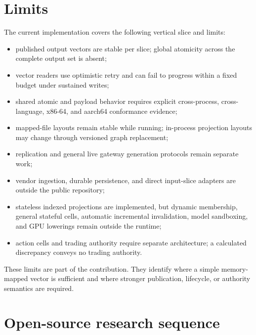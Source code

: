 \documentclass{strategynet-journal}
\begin{document}
\begin{SNcolumns}

\section{Limits}

The current implementation covers the following vertical slice and limits:
\begin{itemize}
  \item published output vectors are stable per slice; global atomicity across
        the complete output set is absent;
  \item vector readers use optimistic retry and can fail to progress within a
        fixed budget under sustained writes;
  \item shared atomic and payload behavior requires explicit cross-process,
        cross-language, x86-64, and aarch64 conformance evidence;
  \item mapped-file layouts remain stable while running; in-process projection
        layouts may change through versioned graph replacement;
  \item replication and general live gateway generation protocols remain
        separate work;
  \item vendor ingestion, durable persistence, and direct input-slice adapters
        are outside the public repository;
  \item stateless indexed projections are implemented, but dynamic membership,
        general stateful cells, automatic incremental invalidation, model
        sandboxing, and GPU lowerings remain outside the runtime;
  \item action cells and trading authority require separate architecture; a
        calculated discrepancy conveys no trading authority.
\end{itemize}

These limits are part of the contribution.  They identify where a simple
memory-mapped vector is sufficient and where stronger publication, lifecycle,
or authority semantics are required.

\section{Open-source research sequence}


\end{SNcolumns}
\end{document}
